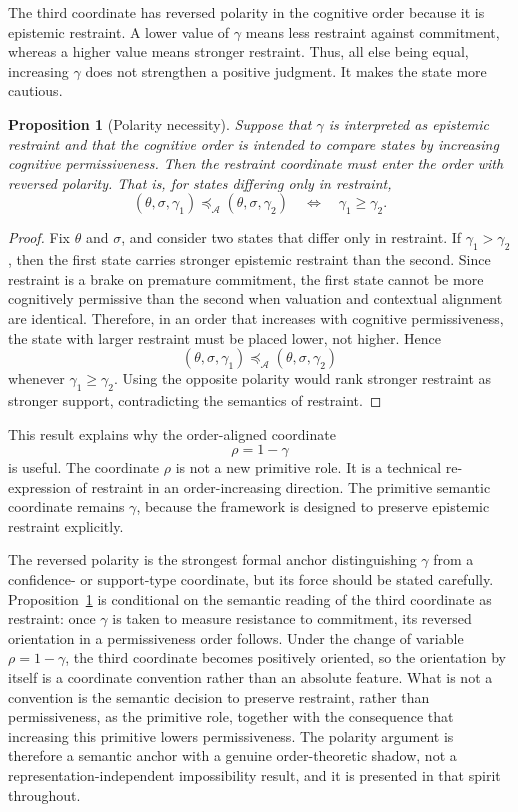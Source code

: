 \documentclass[reqno,final]{amsart}
\theoremstyle{definition}
\theoremstyle{plain}
\newtheorem{proposition}{Proposition}
\theoremstyle{remark}
\providecommand{\preceqA}{\preceq_{\mathcal A}}
\begin{document}
The third coordinate has reversed polarity in the cognitive order because it is epistemic restraint. A lower value of \(\gamma\) means less restraint against commitment, whereas a higher value means stronger restraint. Thus, all else being equal, increasing \(\gamma\) does not strengthen a positive judgment. It makes the state more cautious.

\begin{proposition}[Polarity necessity]
\label{thm:polarity-necessity}
Suppose that \(\gamma\) is interpreted as epistemic restraint and that the cognitive order is intended to compare states by increasing cognitive permissiveness. Then the restraint coordinate must enter the order with reversed polarity. That is, for states differing only in restraint,
\[
(\theta,\sigma,\gamma_1) \preceqA (\theta,\sigma,\gamma_2)
\quad \Longleftrightarrow \quad
\gamma_1\ge \gamma_2.
\]
\end{proposition}

\begin{proof}
Fix \(\theta\) and \(\sigma\), and consider two states that differ only in restraint. If \(\gamma_1>\gamma_2\), then the first state carries stronger epistemic restraint than the second. Since restraint is a brake on premature commitment, the first state cannot be more cognitively permissive than the second when valuation and contextual alignment are identical. Therefore, in an order that increases with cognitive permissiveness, the state with larger restraint must be placed lower, not higher. Hence
\[
(\theta,\sigma,\gamma_1) \preceqA (\theta,\sigma,\gamma_2)
\]
whenever \(\gamma_1\ge \gamma_2\). Using the opposite polarity would rank stronger restraint as stronger support, contradicting the semantics of restraint. 
\end{proof}

This result explains why the order-aligned coordinate
\[
\rho=1-\gamma
\]
is useful. The coordinate \(\rho\) is not a new primitive role. It is a technical re-expression of restraint in an order-increasing direction. The primitive semantic coordinate remains \(\gamma\), because the framework is designed to preserve epistemic restraint explicitly.

The reversed polarity is the strongest formal anchor distinguishing \(\gamma\) from a confidence- or support-type coordinate, but its force should be stated carefully. Proposition~\ref{thm:polarity-necessity} is conditional on the semantic reading of the third coordinate as restraint: once \(\gamma\) is taken to measure resistance to commitment, its reversed orientation in a permissiveness order follows. Under the change of variable \(\rho=1-\gamma\), the third coordinate becomes positively oriented, so the orientation by itself is a coordinate convention rather than an absolute feature. What is not a convention is the semantic decision to preserve restraint, rather than permissiveness, as the primitive role, together with the consequence that increasing this primitive lowers permissiveness. The polarity argument is therefore a semantic anchor with a genuine order-theoretic shadow, not a representation-independent impossibility result, and it is presented in that spirit throughout.
\end{document}
